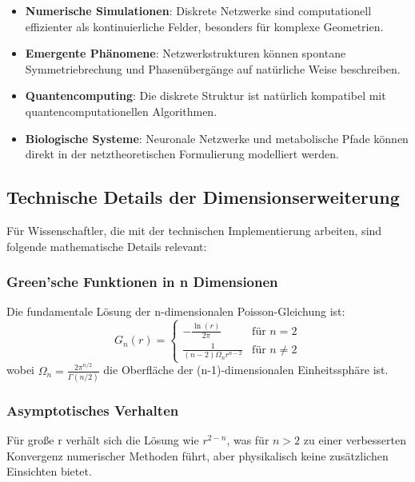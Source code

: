 \documentclass[12pt,a4paper]{report}
\begin{document}
	\begin{itemize}
		\item \textbf{Numerische Simulationen}: Diskrete Netzwerke sind computationell effizienter als kontinuierliche Felder, besonders für komplexe Geometrien.
		
		\item \textbf{Emergente Phänomene}: Netzwerkstrukturen können spontane Symmetriebrechung und Phasenübergänge auf natürliche Weise beschreiben.
		
		\item \textbf{Quantencomputing}: Die diskrete Struktur ist natürlich kompatibel mit quantencomputationellen Algorithmen.
		
		\item \textbf{Biologische Systeme}: Neuronale Netzwerke und metabolische Pfade können direkt in der netztheoretischen Formulierung modelliert werden.
	\end{itemize}
	
	\subsection{Technische Details der Dimensionserweiterung}
	
	Für Wissenschaftler, die mit der technischen Implementierung arbeiten, sind folgende mathematische Details relevant:
	
	\subsubsection{Green'sche Funktionen in n Dimensionen}
	Die fundamentale Lösung der n-dimensionalen Poisson-Gleichung ist:
	\begin{equation}
		G_n(r) = \begin{cases}
			-\frac{\ln(r)}{2\pi} & \text{für } n = 2 \\
			\frac{1}{(n-2)\Omega_n r^{n-2}} & \text{für } n \neq 2
		\end{cases}
	\end{equation}
	wobei $\Omega_n = \frac{2\pi^{n/2}}{\Gamma(n/2)}$ die Oberfläche der (n-1)-dimensionalen Einheitssphäre ist.
	
	\subsubsection{Asymptotisches Verhalten}
	Für große r verhält sich die Lösung wie $r^{2-n}$, was für $n > 2$ zu einer verbesserten Konvergenz numerischer Methoden führt, aber physikalisch keine zusätzlichen Einsichten bietet.
	
\end{document}
